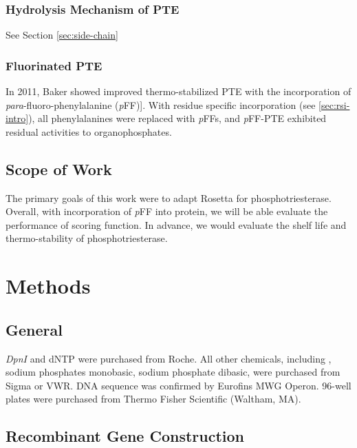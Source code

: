 \begin{refsection}
\subsubsection{Hydrolysis Mechanism of PTE}

See Section \ref{sec:side-chain}

\subsubsection{Fluorinated PTE}

In 2011, Baker  showed improved thermo-stabilized PTE with the
incorporation of \emph{para}-fluoro-phenylalanine
(\emph{p}FF)]\cite{Baker2011b}. With residue specific incorporation (see
\ref{sec:rsi-intro}), all phenylalanines were replaced with \emph{p}FFs, and
\emph{p}FF-PTE exhibited residual activities to organophosphates.

\subsection{Scope of Work}

The primary goals of this work were to adapt Rosetta for phosphotriesterase.
Overall, with incorporation of \emph{p}FF into protein, we will be able
evaluate the performance of scoring function. In advance, we would evaluate the
shelf life and thermo-stability of phosphotriesterase.

\section{Methods}

\subsection{General}

\emph{DpnI} and dNTP were purchased from Roche. All other chemicals, including
, sodium phosphates monobasic, sodium phosphate dibasic, were
purchased from Sigma or VWR. DNA sequence was confirmed by Eurofins MWG Operon.
96-well plates were purchased from Thermo Fisher Scientific (Waltham, MA).

\subsection{Recombinant Gene Construction}


\end{refsection}
